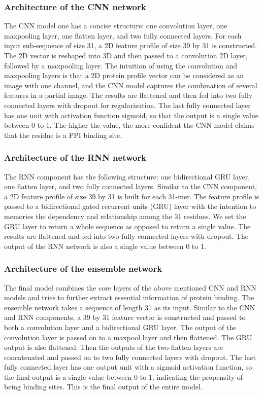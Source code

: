 \subsubsection{Architecture of the CNN network}
The CNN model one has a concise structure: one convolution layer, one maxpooling layer, one flatten layer, and two fully connected layers. For each input sub-sequence of size 31, a 2D feature profile of size 39 by 31 is constructed. The 2D vector is reshaped into 3D and then passed to a convolution 2D layer, followed by a maxpooling layer. The intuition of using the convolution and maxpooling layers is that a 2D protein profile vector can be considered as an image with one channel, and the CNN model captures the combination of several features in a partial image. The results are flattened and then fed into two fully connected layers with dropout for regularization. The last fully connected layer has one unit with activation function sigmoid, so that the output is a single value between 0 to 1. The higher the value, the more confident the CNN model claims that the residue is a PPI binding site.
\subsubsection{Architecture of the RNN network}
The RNN component has the following structure: one bidirectional GRU layer, one flatten layer, and two fully connected layers. Similar to the CNN component, a 2D feature profile of size 39 by 31 is built for each 31-mer. The feature profile is passed to a bidirectional gated recurrent units (GRU) layer with the intention to memories the dependency and relationship among the 31 residues. We set the GRU layer to return a whole sequence as opposed to return a single value. The results are flattened and fed into two fully connected layers with dropout. The output of the RNN network is also a single value between 0 to 1.
\subsubsection{Architecture of the ensemble network \label{section_ensemble}}
The final model combines the core layers of the above mentioned CNN and RNN models and tries to further extract essential information of protein binding. The ensemble network takes a sequence of length 31 as its input. Similar to the CNN and RNN components, a 39 by 31 feature vector is constructed and passed to both a convolution layer and a bidirectional GRU layer. The output of the convolution layer is passed on to a maxpool layer and then flattened. The GRU output is also flattened. Then the outputs of the two flatten layers are concatenated and passed on to two fully connected layers with dropout. The last fully connected layer has one output unit with a sigmoid activation function, so the final output is a single value between 0 to 1, indicating the propensity of being binding sites. This is the final output of the entire model. 

